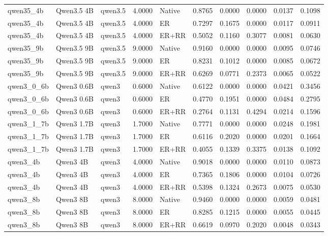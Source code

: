 \begin{tabular}{lllrlrrrrr}
qwen35_4b & Qwen3.5 4B & qwen3.5 & 4.0000 & Native & 0.8765 & 0.0000 & 0.0000 & 0.0137 & 0.1098 \\
qwen35_4b & Qwen3.5 4B & qwen3.5 & 4.0000 & ER & 0.7297 & 0.1675 & 0.0000 & 0.0117 & 0.0911 \\
qwen35_4b & Qwen3.5 4B & qwen3.5 & 4.0000 & ER+RR & 0.5052 & 0.1160 & 0.3077 & 0.0081 & 0.0630 \\
qwen35_9b & Qwen3.5 9B & qwen3.5 & 9.0000 & Native & 0.9160 & 0.0000 & 0.0000 & 0.0095 & 0.0746 \\
qwen35_9b & Qwen3.5 9B & qwen3.5 & 9.0000 & ER & 0.8231 & 0.1012 & 0.0000 & 0.0085 & 0.0672 \\
qwen35_9b & Qwen3.5 9B & qwen3.5 & 9.0000 & ER+RR & 0.6269 & 0.0771 & 0.2373 & 0.0065 & 0.0522 \\
qwen3_0_6b & Qwen3 0.6B & qwen3 & 0.6000 & Native & 0.6122 & 0.0000 & 0.0000 & 0.0421 & 0.3456 \\
qwen3_0_6b & Qwen3 0.6B & qwen3 & 0.6000 & ER & 0.4770 & 0.1951 & 0.0000 & 0.0484 & 0.2795 \\
qwen3_0_6b & Qwen3 0.6B & qwen3 & 0.6000 & ER+RR & 0.2764 & 0.1131 & 0.4294 & 0.0214 & 0.1596 \\
qwen3_1_7b & Qwen3 1.7B & qwen3 & 1.7000 & Native & 0.7771 & 0.0000 & 0.0000 & 0.0248 & 0.1981 \\
qwen3_1_7b & Qwen3 1.7B & qwen3 & 1.7000 & ER & 0.6116 & 0.2020 & 0.0000 & 0.0201 & 0.1664 \\
qwen3_1_7b & Qwen3 1.7B & qwen3 & 1.7000 & ER+RR & 0.4055 & 0.1339 & 0.3375 & 0.0138 & 0.1092 \\
qwen3_4b & Qwen3 4B & qwen3 & 4.0000 & Native & 0.9018 & 0.0000 & 0.0000 & 0.0110 & 0.0873 \\
qwen3_4b & Qwen3 4B & qwen3 & 4.0000 & ER & 0.7365 & 0.1806 & 0.0000 & 0.0104 & 0.0726 \\
qwen3_4b & Qwen3 4B & qwen3 & 4.0000 & ER+RR & 0.5398 & 0.1324 & 0.2673 & 0.0075 & 0.0530 \\
qwen3_8b & Qwen3 8B & qwen3 & 8.0000 & Native & 0.9460 & 0.0000 & 0.0000 & 0.0059 & 0.0481 \\
qwen3_8b & Qwen3 8B & qwen3 & 8.0000 & ER & 0.8285 & 0.1215 & 0.0000 & 0.0055 & 0.0445 \\
qwen3_8b & Qwen3 8B & qwen3 & 8.0000 & ER+RR & 0.6619 & 0.0970 & 0.2020 & 0.0048 & 0.0343 \\
\bottomrule
\end{tabular}
